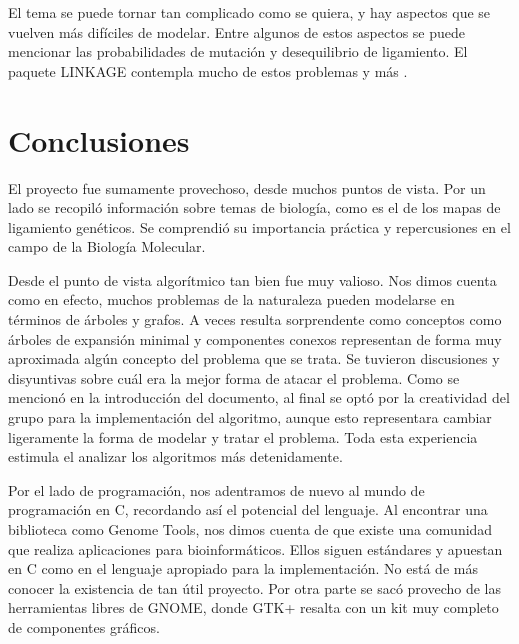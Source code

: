\documentclass{article}
\begin{document}
	El tema se puede tornar tan complicado como se quiera, y hay aspectos que se vuelven más difíciles de modelar. Entre algunos de estos aspectos se puede mencionar las probabilidades de mutación y desequilibrio de ligamiento. El paquete LINKAGE contempla mucho de estos problemas y más \cite{terwilliger1994handbook}.
	
	\section{Conclusiones}
	
	El proyecto fue sumamente provechoso, desde muchos puntos de vista. Por un lado se recopiló información sobre temas de biología, como es el de los mapas de ligamiento genéticos. Se comprendió su importancia práctica y repercusiones en el campo de la Biología Molecular.
	
	Desde el punto de vista algorítmico tan bien fue muy valioso. Nos dimos cuenta como en efecto, muchos problemas de la naturaleza pueden modelarse en términos de árboles y grafos. A veces resulta sorprendente como conceptos como árboles de expansión minimal y componentes conexos representan de forma muy aproximada algún concepto del problema que se trata. Se tuvieron discusiones y disyuntivas sobre cuál era la mejor forma de atacar el problema. Como se mencionó en la introducción del documento, al final se optó por la creatividad del grupo para la implementación del algoritmo, aunque esto representara cambiar ligeramente la forma de modelar y tratar el problema. Toda esta experiencia estimula el analizar los algoritmos más detenidamente.
	
	Por el lado de programación, nos adentramos de nuevo al mundo de programación en C, recordando así el potencial del lenguaje. Al encontrar una biblioteca como Genome Tools, nos dimos cuenta de que existe una comunidad que realiza aplicaciones para bioinformáticos. Ellos siguen estándares y apuestan en C como en el lenguaje apropiado para la implementación. No está de más conocer la existencia de tan útil proyecto. Por otra parte se sacó provecho de las herramientas libres de GNOME, donde GTK+ resalta con un kit muy completo de componentes gráficos.
	
	
	
	
\end{document}
